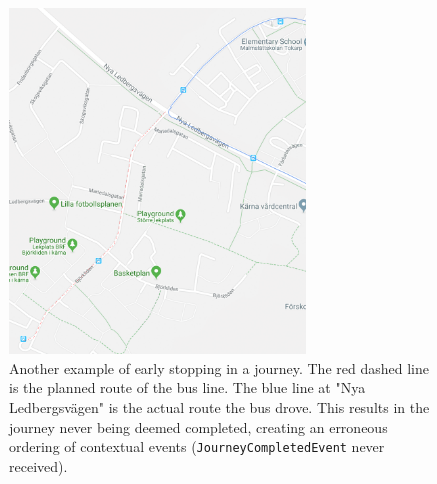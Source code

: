 \begin{figure}[!ht]
        \centering
        \includegraphics[width=0.7\textwidth]{figures/lazy_driver_2}
        \caption[Another example of early stopping in a journey]
        {\small Another example of early stopping in a journey.
        The red dashed line is the planned route of the bus line.
        The blue line at "Nya Ledbergsvägen" is the actual route the bus drove.
        This results in the journey never being deemed completed, creating an erroneous ordering of contextual events (\texttt{JourneyCompletedEvent} never received).}
        \label{fig:human-error-early-stopping-2}
\end{figure}

